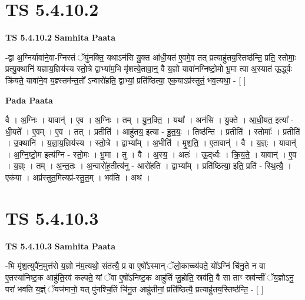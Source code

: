 \documentclass[17pt]{extarticle}
\begin{document}

\section{ TS 5.4.10.2 }

\textbf{TS 5.4.10.2 } \newline
\textbf{Samhita Paata} \newline

-द्वा अ॒ग्निर्यावा॑ने॒वा-ग्निस्तं ॅयु॑नक्ति॒ यथाऽन॑सि यु॒क्त आ॑धी॒यत॑ ए॒वमे॒व तत् प्रत्याहु॑तय॒स्तिष्ठ॑न्ति॒ प्रति॒ स्तोमाः॒ प्रत्यु॒क्थानि॑ यज्ञाय॒ज्ञिय॑स्य स्तो॒त्रे द्वाभ्या॑म॒भि मृ॑शत्ये॒तावा॒न्॒ वै य॒ज्ञो यावा॑नग्निष्टो॒मो भू॒मा त्वा अ॒स्यात॑ ऊ॒र्द्ध्वः क्रि॑यते॒ यावा॑ने॒व य॒ज्ञ्स्तम॑न्त॒तो᳚ ऽन्वारो॑हति॒ द्वाभ्यां॒ प्रति॑ष्ठित्या॒ एक॒याऽप्र॑स्तुतं॒ भव॒त्यथा॒ - [  ] \newline

\textbf{Pada Paata} \newline

वै । अ॒ग्निः । यावान्॑ । ए॒व । अ॒ग्निः । तम् । यु॒न॒क्ति॒ । यथा᳚ । अन॑सि । यु॒क्ते । आ॒धी॒यत॒ इत्या᳚ - धी॒यते᳚ । ए॒वम् । ए॒व । तत् । प्रतीति॑ । आहु॑तय॒ इत्या - हु॒त॒यः॒ । तिष्ठ॑न्ति । प्रतीति॑ । स्तोमाः᳚ । प्रतीति॑ । उ॒क्थानि॑ । य॒ज्ञा॒य॒ज्ञिय॑स्य । स्तो॒त्रे । द्वाभ्या᳚म् । अ॒भीति॑ । मृ॒श॒ति॒ । ए॒तावान्॑ । वै । य॒ज्ञ्ः । यावान्॑ । अ॒ग्नि॒ष्टो॒म इत्य॑ग्नि - स्तो॒मः । भू॒मा । तु । वै । अ॒स्य॒ । अतः॑ । ऊ॒द्‌र्ध्वः । क्रि॒य॒ते॒ । यावान्॑ । ए॒व । य॒ज्ञ्ः । तम् । अ॒न्त॒तः । अ॒न्वारो॑ह॒तीत्य॑नु - आरो॑हति । द्वाभ्या᳚म् । प्रति॑ष्ठित्या॒ इति॒ प्रति॑ - स्थि॒त्यै॒ । एक॑या । अप्र॑स्तुत॒मित्यप्र॑-स्तु॒त॒म् । भव॑ति । अथ॑ ।  \newline





\section{ TS 5.4.10.3 }

\textbf{TS 5.4.10.3 } \newline
\textbf{Samhita Paata} \newline

-भि मृ॑श॒त्युपै॑न॒मुत्त॑रो य॒ज्ञो न॑म॒त्यथो॒ संत॑त्यै॒ प्र वा ए॒षो᳚ऽस्मान् ॅलो॒काच्च्य॑वते॒ यो᳚ऽग्निं चि॑नु॒ते न वा ए॒तस्या॑निष्ट॒क आहु॑ति॒रव॑ कल्पते॒ यां ॅवा ए॒षो॑ऽनिष्ट॒क आहु॑तिं जु॒होति॒ स्रव॑ति॒ वै सा ताꣳ स्रव॑न्तीं ॅय॒ज्ञोऽनु॒ परा॑ भवति य॒ज्ञ्ं ॅयज॑मानो॒ यत् पु॑नश्चि॒तिं चि॑नु॒त आहु॑तीनां॒ प्रति॑ष्ठित्यै॒ प्रत्याहु॑तय॒स्तिष्ठ॑न्ति॒ - [  ] \newline
\end{document}
